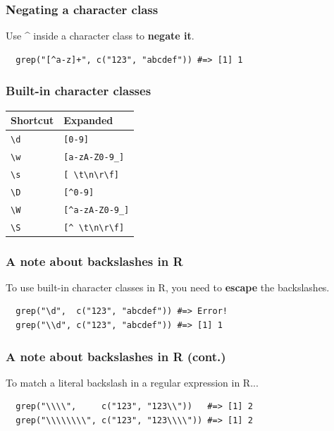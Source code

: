\documentclass{beamer}
\begin{document}
\begin{frame}[fragile]
  \frametitle{Negating a character class}
  Use \^{} inside a character class to \textbf{negate it}.
  \vspace{3mm}

\begin{verbatim}
  grep("[^a-z]+", c("123", "abcdef")) #=> [1] 1
\end{verbatim}
\end{frame}
\begin{frame}
  \frametitle{Built-in character classes}
  \begin{tabular}{|l|l|}
    \hline \textbf{Shortcut} & \textbf{Expanded} \\
    \hline \texttt{\textbackslash d} & \texttt{[0-9]} \\
    \hline \texttt{\textbackslash w} & \texttt{[a-zA-Z0-9\_]} \\
    \hline \texttt{\textbackslash s} & \texttt{[ \textbackslash t\textbackslash n\textbackslash r\textbackslash f]} \\
    \hline \texttt{\textbackslash D} & \texttt{[\textasciicircum 0-9]} \\
    \hline \texttt{\textbackslash W} & \texttt{[\textasciicircum a-zA-Z0-9\_]} \\
    \hline \texttt{\textbackslash S} & \texttt{[\textasciicircum \ \textbackslash t\textbackslash n\textbackslash r\textbackslash f]} \\
    \hline
  \end{tabular}
\end{frame}
\begin{frame}[fragile]
  \frametitle{A note about backslashes in R}
  To use built-in character classes in R, you need to \textbf{escape} the
  backslashes.
  \vspace{3mm}

\begin{verbatim}
  grep("\d",  c("123", "abcdef")) #=> Error!
  grep("\\d", c("123", "abcdef")) #=> [1] 1
\end{verbatim}
\end{frame}
\begin{frame}[fragile]
  \frametitle{A note about backslashes in R (cont.)}
  To match a literal backslash in a regular expression in R...
  \vspace{3mm}

\begin{verbatim}
  grep("\\\\",     c("123", "123\\"))   #=> [1] 2
  grep("\\\\\\\\", c("123", "123\\\\")) #=> [1] 2
\end{verbatim}
\end{frame}
\end{document}
